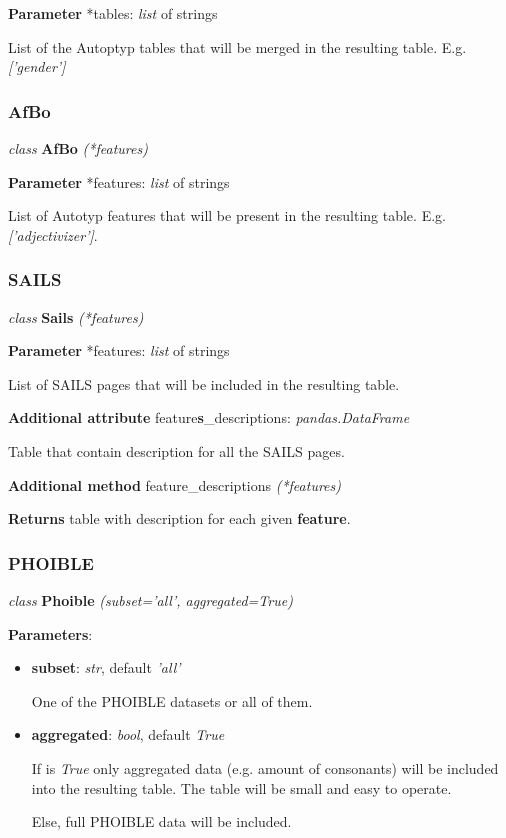 \documentclass[a4paper,12pt]{article}
\begin{document}
\textbf{Parameter} *tables: \textit{list} of strings

List of the Autoptyp tables that will be merged in the resulting table. E.g. \textit{['gender']}

\subsubsection{AfBo}
\textit{class} \textbf{AfBo} \textit{(*features)}
\medskip

\textbf{Parameter} *features: \textit{list} of strings

List of Autotyp features that will be present in the resulting table. E.g. \textit{['adjectivizer']}.

\subsubsection{SAILS}

\textit{class} \textbf{Sails} \textit{(*features)}
\medskip

\textbf{Parameter} *features: \textit{list} of strings

List of SAILS pages that will be included in the resulting table.
\medskip

\textbf{Additional attribute} feature\textbf{s}\_descriptions: \textit{pandas.DataFrame}

Table that contain description for all the SAILS pages.
\medskip

\textbf{Additional method} feature\_descriptions \textit{(*features)}

\textbf{Returns} table with description for each given \textbf{feature}.

\subsubsection{PHOIBLE}

\textit{class} \textbf{Phoible} \textit{(subset='all', aggregated=True)}
\medskip

\textbf{Parameters}:
\begin{itemize}
 \item \textbf{subset}: \textit{str}, default \textit{'all'}
 
 One of the PHOIBLE datasets or all of them.
 \item \textbf{aggregated}: \textit{bool}, default \textit{True}
 
 If is \textit{True} only aggregated data (e.g. amount of consonants) will be included into the resulting table. The table will be small and easy to operate.
 
 Else, full PHOIBLE data will be included.
\end{itemize}
\end{document}
